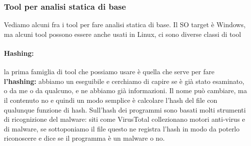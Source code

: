 \documentclass[12pt, oneside]{extbook}
\begin{document}
\subsubsection{Tool per analisi statica di base}
Vediamo alcuni fra i tool per fare analisi statica di base. Il SO target è Windows, ma alcuni tool possono essere anche usati in Linux, ci sono diverse classi di tool\\
\paragraph{Hashing:} la prima famiglia di tool che possiamo usare è quella che serve per fare \textbf{l'hashing:} abbiamo un eseguibile e cerchiamo di capire se è già stato esaminato, o da me o da qualcuno, e ne abbiamo già informazioni. Il nome può cambiare, ma il contenuto no e quindi un modo semplice è calcolare l'hash del file con qualunque funzione di hash. Sull'hash dei programmi sono basati molti strumenti di ricognizione del malware: siti come VirusTotal collezionano motori anti-virus e di malware, se sottoponiamo il file questo ne registra l'hash in modo da poterlo riconoscere e dice se il programma è un malware o no. 
\\
\end{document}
